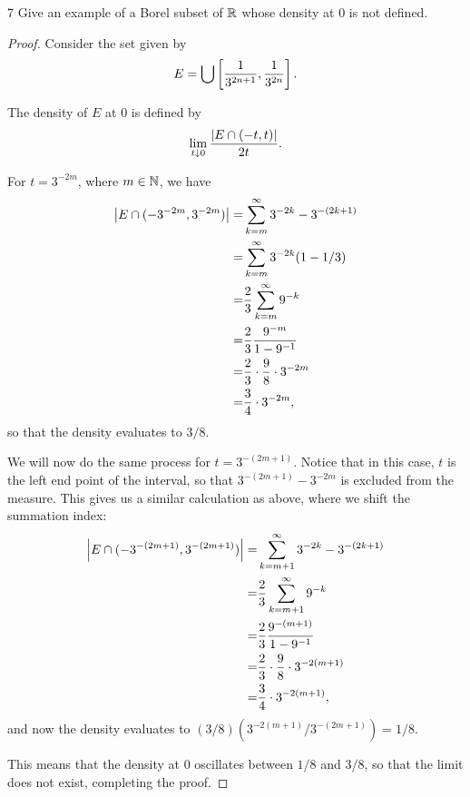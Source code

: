 \begin{exercise}{7}
Give an example of a Borel subset of $\mathbb{R}$ whose density at 0 is not defined.
\end{exercise}
\begin{proof}
Consider the set given by 
\begin{align*}
    E = \bigcup \left[ \frac{1}{3^{2n+1}}, \frac{1}{3^{2n}}\right].
\end{align*}

The density of $E$ at 0 is defined by 
\begin{align*}
    \lim_{t \downarrow 0} \frac{\left\lvert E \cap (-t, t)\right\rvert}{2t}.
\end{align*}

For $t = 3^{-2m}$, where $m \in \mathbb{N}$, we have 
\begin{align*}
    \left\lvert E \cap (-3^{-2m}, 3^{-2m})\right\rvert 
    =& \sum_{k=m}^\infty 3^{-2k} - 3^{-(2k+1)}\\
    =& \sum_{k=m}^\infty 3^{-2k} (1 - 1/3)\\
    =& \frac{2}{3}\sum_{k=m}^\infty 9^{-k}\\
    =& \frac{2}{3}\frac{9^{-m}}{1-9^{-1}}\\
    =& \frac{2}{3} \cdot \frac{9}{8} \cdot 3^{-2m}\\
    =& \frac{3}{4} \cdot 3^{-2m},
\end{align*}
so that the density evaluates to $3/8$.

We will now do the same process for $t = 3^{-(2m+1)}$.
Notice that in this case, $t$ is the left end point of the interval, so that $3^{-(2m+1)} - 3^{-2m}$ is excluded from the measure.
This gives us a similar calculation as above, where we shift the summation index:
\begin{align*}
    \left\lvert E \cap (-3^{-(2m+1)}, 3^{-(2m+1)})\right\rvert 
    =& \sum_{k=m+1}^\infty 3^{-2k} - 3^{-(2k+1)}\\
    =& \frac{2}{3}\sum_{k=m+1}^\infty 9^{-k}\\
    =& \frac{2}{3}\frac{9^{-(m+1)}}{1-9^{-1}}\\
    =& \frac{2}{3} \cdot \frac{9}{8} \cdot 3^{-2(m+1)}\\
    =& \frac{3}{4} \cdot 3^{-2(m+1)},
\end{align*}
and now the density evaluates to $(3/8)(3^{-2(m+1)}/3^{-(2m+1)}) = 1/8$.

This means that the density at 0 oscillates between $1/8$ and $3/8$, so that the limit does not exist, completing the proof.
\end{proof} 


